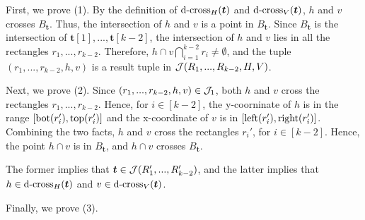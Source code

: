 First, we prove (1). By the definition of $\mathrm{d\text{-}cross}_H(\textrm{\boldmath${t}$})$ and $\mathrm{d\text{-}cross}_V(\textrm{\boldmath${t}$})$, $h$ and $v$ crosses $B_\bm{t}$. Thus, the intersection of $h$ and $v$ is a point in $B_\bm{t}$. Since $B_\bm{t}$ is the intersection of $\bm{t}[1],...,\bm{t}[k-2]$, the intersection of $h$ and $v$ lies in all the rectangles $r_1,...,r_{k-2}$. Therefore, $h\cap v\bigcap_{i = 1}^{k-2}r_i \neq \emptyset$, and  the tuple $(r_1,...,r_{k-2},h,v)$ is a result tuple in $\mathcal{J}(R_1,...,R_{k-2},H,V)$. 

Next, we prove (2). Since $(r_1,...,r_{k-2},h,v)\in \mathcal{J}_1$, both $h$
 and $v$ cross the rectangles $r_1,...,r_{k-2}$. Hence, for $i\in[k-2]$, the y-coorninate of $h$ is in the range $[\mathrm{bot}(r_i'), \mathrm{top}(r_i')]$ and the x-coordinate of $v$ is in $[\mathrm{left}(r_i'), \mathrm{right}(r_i')]$. Combining the two facts, $h$ and $v$ cross the rectangles $r_i'$, for $i\in[k-2]$. Hence, the point $h \cap v$ is in $B_\bm{t}$, and $h \cap v$ crosses $B_{\bm{t}}$.
 
 The former implies that $\textrm{\boldmath${t}$} \in \mathcal{J}(R_1',...,R_{k-2}')$, and the latter implies that $h \in \mathrm{d\text{-}cross}_H(\textrm{\boldmath${t}$})$ and $v \in \mathrm{d\text{-}cross}_V(\textrm{\boldmath${t}$})$.

Finally, we prove (3).